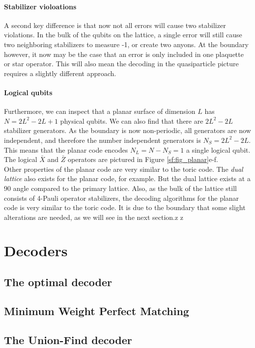 \paragraph{Stabilizer violoations}
A second key difference is that now not all errors will cause two stabilizer violations. In the bulk of the qubits on the lattice, a single error will still cause two neighboring stabilizers to measure -1, or create two anyons. At the boundary however, it now may be the case that an error is only included in one plaquette or star operator. This will also mean the decoding in the quasiparticle picture requires a slightly different approach.

\paragraph{Logical qubits}
Furthermore, we can inspect that a planar surface of dimension $L$ has $N = 2L^2-2L+1$ physical qubits. We can also find that there are $2L^2-2L$ stabilizer generators. As the boundary is now non-periodic, all generators are now independent, and therefore the number independent generators is $N_S = 2L^2-2L$. This means that the planar code encodes $N_L = N-N_S = 1$ a single logical qubit. The logical $\bar{X}$ and $\bar{Z}$ operators are pictured in Figure \ref{sf:fig_planar}e-f.\\

Other properties of the planar code are very similar to the toric code. The \emph{dual lattice} also exists for the planar code, for example. But the dual lattice exists at a 90 angle compared to the primary lattice. Also, as the bulk of the lattice still consists of 4-Pauli operator stabilizers, the decoding algorithms for the planar code is very similar to the toric code. It is due to the boundary that some slight alterations are needed, as we will see in the next section.z
z
\section{Decoders}\label{sec:surface_decoders}
\subsection{The optimal decoder}\label{sec:optimal_decoder}
\subsection{Minimum Weight Perfect Matching}\label{sec:MWPMdecoder}
\subsection{The Union-Find decoder}\label{sec:UFdecoder}

